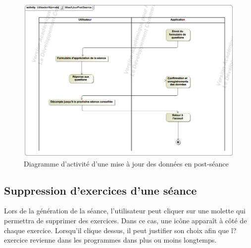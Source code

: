 \begin{figure}[!h]
\includegraphics[scale=0.3]{diagrams/post}
\centering
\caption{Diagramme d'activité d'une mise à jour des données en post-séance}
\end{figure}

\subsection*{Suppression d'exercices d'une séance}

Lors de la génération de la séance, l'utilisateur peut cliquer sur une molette qui permettra de supprimer des exercices. Dans ce cas, une icône apparaît à côté de chaque exercice. Lorsqu'il clique dessus, il peut justifier son choix afin que l?exercice revienne dans les programmes dans plus ou moins longtemps.

